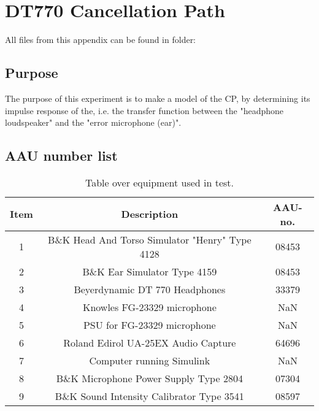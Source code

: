 \section{DT770 Cancellation Path} \label{sec:DT770CPjournal}

All files from this appendix can be found in folder: \\

\subsection{Purpose}
The purpose of this experiment is to make a model of the CP, by determining its impulse response of the, i.e. the transfer function between the "headphone loudspeaker" and the "error microphone (ear)".
		
\subsection{AAU number list}
\begin{table}[h]
	\centering
	\begin{tabular}{ c c c } \toprule
		{Item}	& {Description} 						& {AAU-no}. \\ \bottomrule 
		1	&	B\&K Head And Torso Simulator "Henry" Type 4128	& 08453		\\
		2	&	B\&K Ear Simulator Type 4159			& 08453		\\
		3	&	Beyerdynamic DT 770	Headphones			& 33379		\\
		4	&	Knowles FG-23329 microphone					& NaN		\\
		5	&	PSU for FG-23329  microphone	& NaN\\
		6	&	Roland Edirol UA-25EX Audio Capture		& 64696			\\
		7	&	Computer running Simulink					& NaN		\\
		8	&	B\&K Microphone Power Supply Type 2804 	& 07304		\\
		9	&	B\&K Sound Intensity Calibrator Type 3541	& 08597	\\ \bottomrule
	\end{tabular}
	\caption{Table over equipment used in test.}
	\label{tab:UsedEquipmentListningCP}
\end{table}

